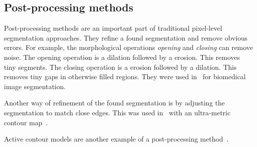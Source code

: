 
\subsection{Post-processing methods}\label{subsec:post-processing-methods}%
Post-processing methods are an important part of traditional pixel-level
segmentation approaches. They refine a found segmentation and remove obvious
errors. For example, the morphological operations \textit{opening} and
\textit{closing} can remove noise. The opening operation is a dilation followed
by a erosion. This removes tiny segments. The closing operation is a erosion
followed by a dilation. This removes tiny gaps in otherwise filled regions.
They were used in~\cite{chen1998image} for biomedical image segmentation.

Another way of refinement of the found segmentation is by adjusting the
segmentation to match close edges. This was used in~\cite{brox2011object} with
an ultra-metric contour map~\cite{arbelaez2009contours}.

Active contour models are another example of a post-processing
method~\cite{kass1988snakes}.

